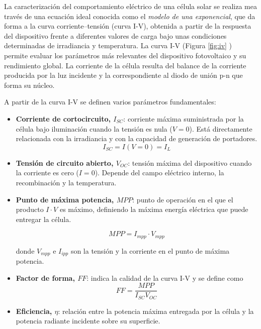 La caracterización del comportamiento eléctrico de una célula solar se realiza mea través de una ecuación ideal conocida como el \textit{modelo de una exponencial}, que da forma a la curva corriente–tensión (curva I-V), obtenida a partir de la respuesta del dispositivo frente a diferentes valores de carga bajo unas condiciones determinadas de irradiancia y temperatura. La curva I-V (Figura \ref{fig:iv} ) permite evaluar los parámetros más relevantes del dispositivo fotovoltaico y su rendimiento global. La corriente de la célula resulta del balance de la corriente producida por la luz incidente y la correspondiente al diodo de unión p-n que forma su núcleo.


A partir de la curva I-V se definen varios parámetros fundamentales:

\begin{itemize}
	\item \textbf{Corriente de cortocircuito, $I_{SC}$}: corriente máxima suministrada por la célula bajo iluminación cuando la tensión es nula ($V = 0$). Está directamente relacionada con la irradiancia y con la capacidad de generación de portadores.
	\begin{equation}
		I_{SC} = I(V=0) = I_L
	\end{equation}
	\item \textbf{Tensión de circuito abierto, $V_{OC}$}: tensión máxima del dispositivo cuando la corriente es cero ($I = 0$). Depende del campo eléctrico interno, la recombinación y la temperatura.
	\item \textbf{Punto de máxima potencia, $MPP$}: punto de operación en el que el producto $I \cdot V$ es máximo, definiendo la máxima energía eléctrica que puede entregar la célula.
	
	\begin{equation}
		MPP = I_{mpp} \cdot V_{mpp}		
	\end{equation}
	
	donde $V_{mpp}$ e $I_{ipp}$ son la tensión y la corriente en el punto de máxima potencia.
	
	\item \textbf{Factor de forma, $FF$}: indica la calidad de la curva I-V y se define como
	\begin{equation}
		FF =\frac{MPP}{I_{SC}V_{OC}}
	\end{equation}
	

	\item \textbf{Eficiencia, $\eta$}: relación entre la potencia máxima entregada por la célula y la potencia radiante incidente sobre su superficie.
\end{itemize}

